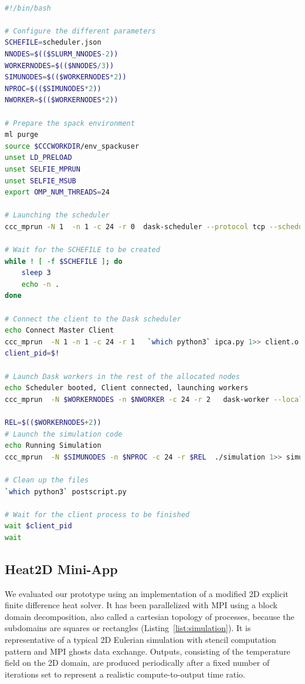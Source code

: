 \begin{lstlisting}[float=h!, label=list:scriptIrene, language=bash, caption=Submission script of simulation and in situ analytics in Irene supercomputer]

#!/bin/bash

# Configure the different parameters 
SCHEFILE=scheduler.json
NNODES=$(($SLURM_NNODES-2))
WORKERNODES=$(($NNODES/3))
SIMUNODES=$(($WORKERNODES*2))
NPROC=$(($SIMUNODES*2))                  
NWORKER=$(($WORKERNODES*2))

# Prepare the spack environment
ml purge
source $CCCWORKDIR/env_spackuser
unset LD_PRELOAD
unset SELFIE_MPRUN
unset SELFIE_MSUB
export OMP_NUM_THREADS=24

# Launching the scheduler
ccc_mprun -N 1  -n 1 -c 24 -r 0  dask-scheduler --protocol tcp --scheduler-file=$SCHEFILE 1>> scheduler.o  2>> scheduler.e  &

# Wait for the SCHEFILE to be created 
while ! [ -f $SCHEFILE ]; do
    sleep 3
    echo -n .
done

# Connect the client to the Dask scheduler
echo Connect Master Client  
ccc_mprun  -N 1 -n 1 -c 24 -r 1   `which python3` ipca.py 1>> client.o 2>> client.e &
client_pid=$!

# Launch Dask workers in the rest of the allocated nodes 
echo Scheduler booted, Client connected, launching workers 
ccc_mprun  -N $WORKERNODES -n $NWORKER -c 24 -r 2   dask-worker --local-directory /tmp  --scheduler-file=${SCHEFILE} 1>> worker.o 2>>worker.e  &
     
REL=$(($WORKERNODES+2))
# Launch the simulation code
echo Running Simulation 
ccc_mprun  -N $SIMUNODES -n $NPROC -c 24 -r $REL  ./simulation 1>> simulation.o 2>> simulation.e 

# Clean up the files 
`which python3` postscript.py

# Wait for the client process to be finished 
wait $client_pid
wait 
\end{lstlisting}

\subsection{Heat2D Mini-App}
We evaluated our prototype using an implementation of a modified 2D explicit finite difference heat solver. It has been parallelized with MPI using a block domain decomposition, also called a cartesian topology of processes, because the subdomains are squares or rectangles (Listing~\ref{list:simulation}).   
It is representative of a typical 2D Eulerian simulation with stencil computation pattern and MPI ghosts data exchange. Outputs, consisting of the temperature field on the 2D domain, are produced periodically after a fixed number of iterations set to represent a realistic compute-to-output time ratio. 

